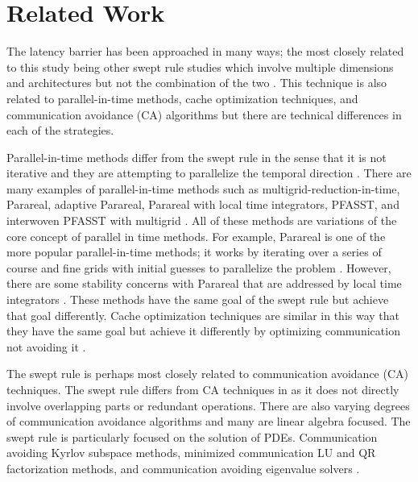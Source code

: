 \documentclass[review]{elsarticle}
\begin{document}
\section{Related Work}
\label{related-section}
\par The latency barrier has been approached in many ways; the most closely related to this study being other swept rule studies which involve multiple dimensions and architectures but not the combination of the two \cite{Alhubail2016ThePDEs,Alhubail2018ThePDEs,Magee2018AcceleratingDecomposition,Magee2020ApplyingSystems}. This technique is also related to parallel-in-time methods, cache optimization techniques, and communication avoidance (CA) algorithms but there are technical differences in each of the strategies.

\par
Parallel-in-time methods differ from the swept rule in the sense that it is not iterative and they are attempting to parallelize the temporal direction \cite{Gander201550Integration}. There are many examples of parallel-in-time methods such as multigrid-reduction-in-time, Parareal, adaptive Parareal, Parareal with local time integrators, PFASST, and interwoven PFASST with multigrid \cite{Falgout2014ParallelMultigrid,Lions2013Resolution,Maday2020AnAlgorithm,Wu2018Parareal,EmmettTowardEquations,MinionINTERWEAVINGMULTIGRID,Hahne2020PyMGRIT:MGRIT}. All of these methods are variations of the core concept of parallel in time methods. For example, Parareal is one of the more popular parallel-in-time methods; it works by iterating over a series of course and fine grids with initial guesses to parallelize the problem \cite{Lions2013Resolution}. However, there are some stability concerns with Parareal that are addressed by local time integrators \cite{Wu2018Parareal}. These methods have the same goal of the swept rule but achieve that goal differently. Cache optimization techniques are similar in this way that they have the same goal but achieve it differently by optimizing communication not avoiding it \cite{Kowarschik2003AnAlgorithms}.

\par
The swept rule is perhaps most closely related to communication avoidance (CA) techniques. The swept rule differs from CA techniques in as it does not directly involve overlapping parts or redundant operations. There are also varying degrees of communication avoidance algorithms and many are linear algebra focused. The swept rule is particularly focused on the solution of PDEs. Communication avoiding Kyrlov subspace methods, minimized communication LU and QR factorization methods, and communication avoiding eigenvalue solvers \cite{DemmelAvoidingComputations, Ballard2011MinimizingAlgebra,BaboulinAMachines,Khabou2012LUVersion,SolomonikAHoefler}. 
\end{document}
